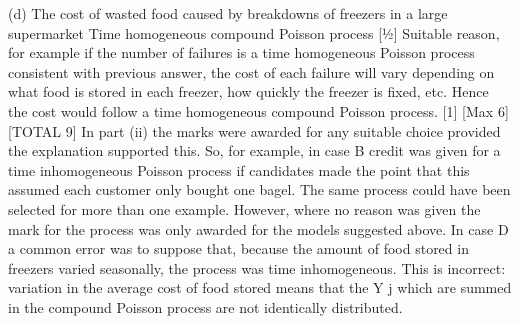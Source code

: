 \documentclass[a4paper,12pt]{article}
\begin{document}
(d)
The cost of wasted food caused by breakdowns of freezers in a large supermarket
Time homogeneous compound Poisson process
[1⁄2]
Suitable reason, for example if the number of failures is a time homogeneous Poisson process consistent with previous answer, the
cost of each failure will vary depending on what food is stored in each
freezer, how quickly the freezer is fixed, etc. Hence the cost would
follow a time homogeneous compound Poisson process.
[1]
[Max 6]
[TOTAL 9]
In part (ii) the marks were awarded for any suitable choice provided the explanation supported this. So, for example, in case B credit was given for a time inhomogeneous Poisson process if candidates made the point that this
assumed each customer only bought one bagel. The same process could have been selected for more than one example. However, where no reason was given the mark for the process was only awarded for the models suggested above. In case D a common error was to suppose that, because
the amount of food stored in freezers varied seasonally, the process was time
inhomogeneous. This is incorrect: variation in the average cost of food stored
means that the Y j which are summed in the compound Poisson process are
not identically distributed.
\end{document}
